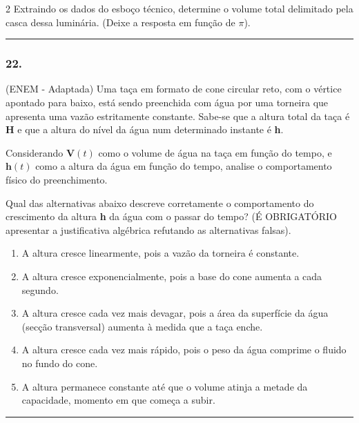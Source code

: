 \documentclass[twoside, 10pt, a4paper]{article}
\newlength{\espacoPreQuestao}\setlength{\espacoPreQuestao}{0.1cm}
\newlength{\espacoQuestao}\setlength{\espacoQuestao}{0.2cm}
\newlength{\espacoAlt}\setlength{\espacoAlt}{0.2cm}
\begin{document}
\begin{multicols*}{2}
Extraindo os dados do esboço técnico, determine o volume total delimitado pela casca dessa luminária. (Deixe a resposta em função de $ \pi $).
\par\vspace{\espacoQuestao}

\noindent\textcolor{CorLinha}{\rule{\linewidth}{0.5pt}} 
\par\vspace{\espacoPreQuestao}
\subsubsection*{22.} (ENEM - Adaptada) Uma taça em formato de cone circular reto, com o vértice apontado para baixo, está sendo preenchida com água por uma torneira que apresenta uma vazão estritamente constante. Sabe-se que a altura total da taça é \textbf{H} e que a altura do nível da água num determinado instante é \textbf{h}.

Considerando $ \textbf{V}(t) $ como o volume de água na taça em função do tempo, e $ \textbf{h}(t) $ como a altura da água em função do tempo, analise o comportamento físico do preenchimento.

Qual das alternativas abaixo descreve corretamente o comportamento do crescimento da altura \textbf{h} da água com o passar do tempo? (É OBRIGATÓRIO apresentar a justificativa algébrica refutando as alternativas falsas).

\begin{enumerate}[label=\alph*), itemsep=\espacoAlt]
\item A altura cresce linearmente, pois a vazão da torneira é constante.
\item A altura cresce exponencialmente, pois a base do cone aumenta a cada segundo.
\item A altura cresce cada vez mais devagar, pois a área da superfície da água (secção transversal) aumenta à medida que a taça enche.
\item A altura cresce cada vez mais rápido, pois o peso da água comprime o fluido no fundo do cone.
\item A altura permanece constante até que o volume atinja a metade da capacidade, momento em que começa a subir.
\end{enumerate}
\par\vspace{\espacoQuestao}

\noindent\textcolor{CorLinha}{\rule{\linewidth}{0.5pt}} 
\par\vspace{\espacoPreQuestao}

\end{multicols*}
\end{document}
